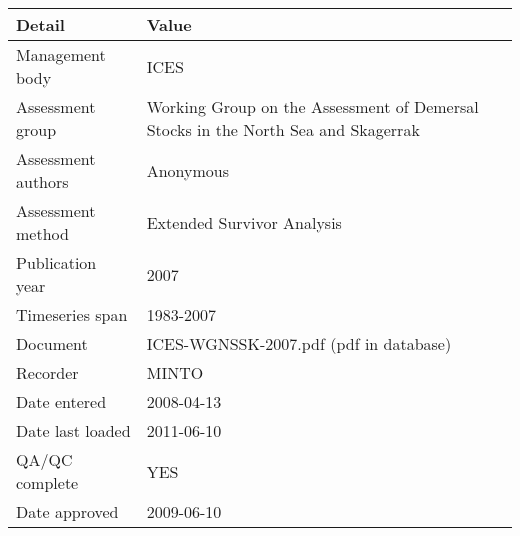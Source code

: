 \begin{table}[htb]
\centering
\begin{tabular}{lp{7cm}}
\toprule
Detail & Value \\
\midrule
Management body    & ICES                                                                              \\
Assessment group   & Working Group on the Assessment of Demersal Stocks in the North Sea and Skagerrak \\
Assessment authors & Anonymous                                                                         \\
Assessment method  & Extended Survivor Analysis                                                        \\
Publication year   & 2007                                                                              \\
Timeseries span    & 1983-2007                                                                         \\
Document           & ICES-WGNSSK-2007.pdf (pdf in database)                                            \\
Recorder           & MINTO                                                                             \\
Date entered       & 2008-04-13                                                                        \\
Date last loaded   & 2011-06-10                                                                        \\
QA/QC complete     & YES                                                                               \\
Date approved      & 2009-06-10                                                                        \\
\bottomrule
\end{tabular}
\label{tab:assessdet}
\end{table}
